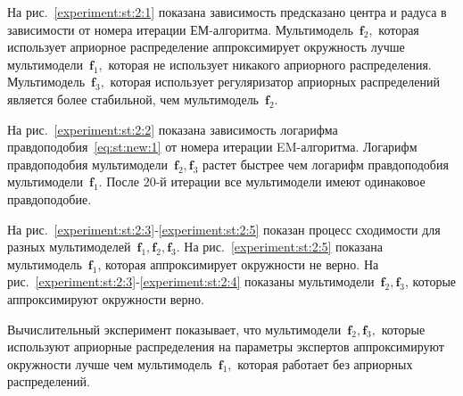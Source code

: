 \documentclass[12pt, twoside]{article}
\numberwithin{equation}{section}
\begin{document}
На рис.~\ref{experiment:st:2:1} показана зависимость предсказано центра и радуса в зависимости от номера итерации ЕМ-алгоритма.
Мультимодель~$\textbf{f}_2,$ которая использует априорное распределение аппроксимирует окружность лучше мультимодели~$\textbf{f}_1,$ которая не использует никакого априорного распределения.
Мультимодель~$\textbf{f}_3,$ которая использует регуляризатор априорных распределений является более стабильной, чем мультимодель~$\textbf{f}_2$.

На рис.~\ref{experiment:st:2:2} показана зависимость логарифма правдоподобия~\eqref{eq:st:new:1} от номера итерации EM-алгоритма.
Логарифм правдоподобия мультимодели~$\textbf{f}_2, \textbf{f}_3$ растет быстрее чем логарифм правдоподобия мультимодели~$\textbf{f}_1$.  После $20$-й итерации все мультимодели имеют одинаковое правдоподобие.

На рис.~\ref{experiment:st:2:3}-\ref{experiment:st:2:5} показан процесс сходимости для разных мультимоделей~$\textbf{f}_1, \textbf{f}_2, \textbf{f}_3$.
На рис.~\ref{experiment:st:2:5} показана мультимодель~$\textbf{f}_1$, которая аппроксимирует окружности не верно.
На рис.~\ref{experiment:st:2:3}-\ref{experiment:st:2:4} показаны мультимодели~$\textbf{f}_2, \textbf{f}_3$, которые аппроксимируют окружности верно.

Вычислительный эксперимент показывает, что мультимодели~$\textbf{f}_2, \textbf{f}_3,$ которые используют априорные распределения на параметры экспертов аппроксимируют окружности лучше чем мультимодель~$\textbf{f}_1,$ которая работает без априорных распределений.
\end{document}
